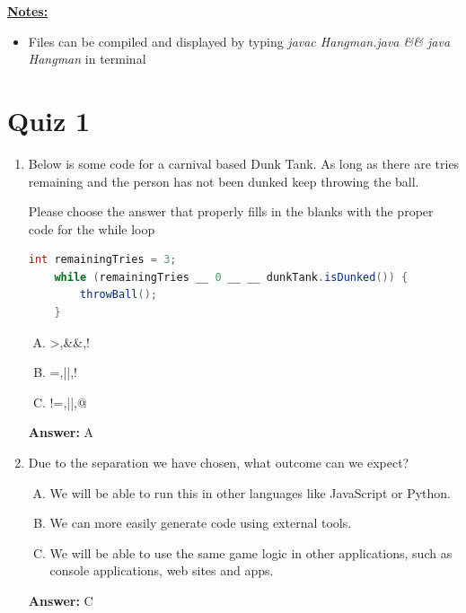 \documentclass[12pt]{article}
\begin{document}
\bigskip

\underline{\textbf{Notes:}}

\bigskip

\begin{itemize}
    \item Files can be compiled and displayed by typing \textit{javac Hangman.java \&\& java Hangman}
    in terminal
\end{itemize}

\bigskip

\section{Quiz 1}

\bigskip

\begin{enumerate}[1.]
    \item

    Below is some code for a carnival based Dunk Tank. As long as there are tries
    remaining and the person has not been dunked keep throwing the ball.

    Please choose the answer that properly fills in the blanks with the proper code
    for the while loop

    \bigskip

    \begin{lstlisting}[language=Java,caption={lesson\_02/Game.java}]
    int remainingTries = 3;
    while (remainingTries __ 0 __ __ dunkTank.isDunked()) {
        throwBall();
    }
    \end{lstlisting}

    \begin{enumerate}[A.]
        \item \textgreater,\&\&,!
        \item =,||,!
        \item !=,||,@
    \end{enumerate}

    \bigskip

    \textbf{Answer:} A

    \item

    Due to the separation we have chosen, what outcome can we expect?

    \bigskip

    \begin{enumerate}[A.]
        \item We will be able to run this in other languages like JavaScript or Python.
        \item We can more easily generate code using external tools.
        \item We will be able to use the same game logic in other applications, such as console applications, web sites and apps.
    \end{enumerate}

    \bigskip

    \textbf{Answer:} C

\end{enumerate}
\end{document}
